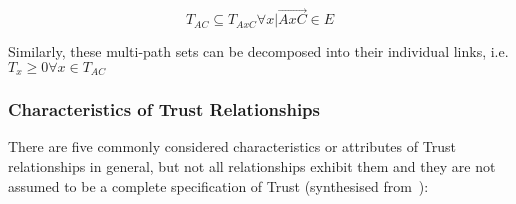 \begin{equation}
	T_{AC} \subseteq T_{AxC} \forall x | \overrightarrow{AxC} \in E
\end{equation}

Similarly, these multi-path sets can be decomposed into their individual links, i.e. $T_x \ge 0 \forall x \in T_{AC}$
\subsubsection{Characteristics of Trust Relationships}

There are five commonly considered characteristics or attributes of Trust relationships in general, but not all relationships exhibit them and they are not assumed to be a complete specification of Trust (synthesised from~\cite{Liu2006,Mayer1995, Mcknight1996, Pavan2015}):

